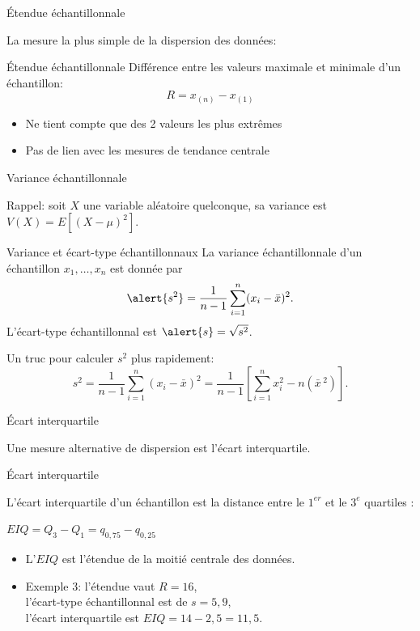 \documentclass{BeamerTemplate}
\begin{document}
\begin{frame}[t]{Étendue échantillonnale}

La mesure la plus simple de la dispersion des données:

\begin{Boite}{Étendue échantillonnale}
Différence entre les valeurs maximale et minimale d'un échantillon:
$$R=x_{(n)}-x_{(1)}$$
\end{Boite}

\begin{itemize}
\item Ne tient compte que des 2 valeurs les plus extrêmes
\item Pas de lien avec les mesures de tendance centrale
\end{itemize}

\end{frame}

\begin{frame}[t]{Variance échantillonnale}

{\small

Rappel: soit $X$ une variable aléatoire quelconque, sa variance est $V(X)=E[(X-\mu)^2]$.

\begin{Boite}{Variance et écart-type échantillonnaux}
La \alert{variance échantillonnale} d'un échantillon $x_1,\ldots,x_n$ est donnée par
$$\alert{s^2}=\frac{1}{n-1}\sum_{i=1}^n(x_i-\bar{x})^2.$$
L'\alert{écart-type échantillonnal} est $\alert{s}=\sqrt{s^2}$.
\end{Boite}
Un truc pour calculer $s^2$ plus rapidement:
$$s^2=\frac{1}{n-1}\sum_{i=1}^n(x_i-\bar{x})^2=\frac{1}{n-1}\left[\sum_{i=1}^nx_i^2-n(\bar{x}\,^2)\right].$$
}
\end{frame}

\begin{frame}[t]{Écart interquartile}

Une mesure alternative de dispersion est \alert{l'écart interquartile}.

\begin{Boite}{Écart interquartile}

L'écart interquartile d'un échantillon est la distance entre le $1^{er}$ et le $3^e$ quartiles :

\vspace{-3mm}
\begin{center}\alert{$EIQ=Q_3-Q_1=q_{0,75}-q_{0,25}$}\end{center}
\end{Boite}
\begin{itemize}
\item L'$EIQ$ est l'étendue de la moitié centrale des données.

\item Exemple 3: l'étendue vaut $R=16$, \\l'écart-type échantillonnal est de $s=5,9$, \\l'écart interquartile est $EIQ=14-2,5=11,5$.
\end{itemize}
\end{frame}
\end{document}
